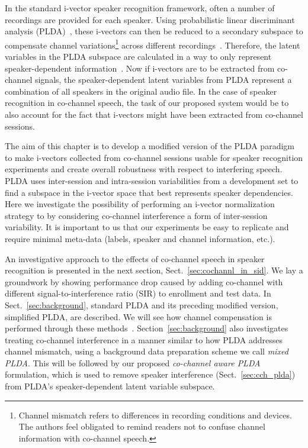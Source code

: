 In the standard i-vector speaker recognition framework, often a number of recordings are provided for each speaker. 
Using probabilistic linear discriminant analysis (PLDA)~\cite{prince_plda}, these i-vectors can then be reduced to a secondary subspace to compensate channel variations\footnote{Channel mismatch refers to differences in recording conditions and devices. The authors feel obligated to remind readers not to confuse channel information with co-channel speech.} across different recordings~\cite{kenny_plda,Daniel2011is}. 
Therefore, the latent variables in the PLDA subspace are calculated in a way to only represent speaker-dependent information~\cite{kenny_plda2,cumani_icassp13,burget_icassp11,yun_icassp12,matejka_icassp11}.
Now if i-vectors are to be extracted from co-channel signals, the speaker-dependent latent variables from PLDA represent a combination of all speakers in the original audio file. 
In the case of speaker recognition in co-channel speech, the task of our proposed system would be to also account for the fact that i-vectors might have been extracted from co-channel sessions. 

The aim of this chapter is to develop a modified version of the PLDA paradigm to make i-vectors collected from co-channel sessions usable for speaker recognition experiments and create overall robustness with respect to interfering speech. 
PLDA uses inter-session and intra-session variabilities from a development set to find a subspace in the i-vector space that best represents speaker dependencies. 
Here we investigate the possibility of performing an i-vector normalization strategy to by considering co-channel interference a form of inter-session variability.  
It is important to us that our experiments be easy to replicate and require minimal meta-data (labels, speaker and channel information, etc.). 

An investigative approach to the effects of co-channel speech in speaker recognition is presented in the next section, Sect.~\ref{sec:cochannl_in_sid}. We lay a groundwork by showing performance drop caused by adding co-channel with different signal-to-interference ratio (SIR) to enrollment and test data. 
In Sect.~\ref{sec:background}, standard PLDA and its preceding modified version, simplified PLDA, are described. 
We will see how channel compensation is performed through these methods~\cite{prince_plda,kenny_plda}. 
Section~\ref{sec:background} also investigates treating co-channel interference in a manner similar to how PLDA addresses channel mismatch, using a background data preparation scheme we call {\it mixed PLDA}. 
This will be followed by our proposed {\it co-channel aware PLDA} formulation, which is used to remove speaker interference (Sect.~\ref{sec:cch_plda}) from PLDA's speaker-dependent latent variable subspace. 

